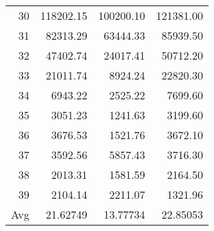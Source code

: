 \begin{table}[ht]
\begin{tabular}{rrrr}
  30 & 118202.15 & 100200.10 & 121381.00 \\ 
  31 & 82313.29 & 63444.33 & 85939.50 \\ 
  32 & 47402.74 & 24017.41 & 50712.20 \\ 
  33 & 21011.74 & 8924.24 & 22820.30 \\ 
  34 & 6943.22 & 2525.22 & 7699.60 \\ 
  35 & 3051.23 & 1241.63 & 3199.60 \\ 
  36 & 3676.53 & 1521.76 & 3672.10 \\ 
  37 & 3592.56 & 5857.43 & 3716.30 \\ 
  38 & 2013.31 & 1581.59 & 2164.50 \\ 
  39 & 2104.14 & 2211.07 & 1321.96 \\ 
   \hline
   Avg &21.62749 &13.77734& 22.85053 
\end{tabular}
\end{table}
